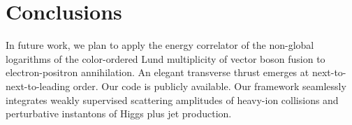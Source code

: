 \section{Conclusions}\label{sec:conclusions}

In future work, we plan to apply the energy correlator of the non-global
logarithms of the color-ordered Lund multiplicity of vector boson fusion
to electron-positron annihilation. An elegant transverse thrust emerges
at next-to-next-to-leading order. Our code is publicly available. Our
framework seamlessly integrates weakly supervised scattering amplitudes
of heavy-ion collisions and perturbative instantons of Higgs plus jet
production.

